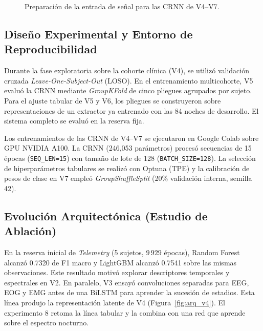 \documentclass[conference]{IEEEtran}
\begin{document}
\begin{figure}[htbp]
\centering
{}
\caption{Preparación de la entrada de señal para las CRNN de V4--V7.}
\label{fig:pipeline_stateless}
\end{figure}

\subsection{Diseño Experimental y Entorno de Reproducibilidad}
Durante la fase exploratoria sobre la cohorte clínica (V4), se utilizó validación cruzada \textit{Leave-One-Subject-Out} (LOSO). En el entrenamiento multicohorte, V5 evaluó la CRNN mediante \textit{GroupKFold} de cinco pliegues agrupados por sujeto. Para el ajuste tabular de V5 y V6, los pliegues se construyeron sobre representaciones de un extractor ya entrenado con las 84 noches de desarrollo. El sistema completo se evaluó en la reserva fija.

Los entrenamientos de las CRNN de V4--V7 se ejecutaron en Google Colab sobre GPU NVIDIA A100. La CRNN (246,053 parámetros) procesó secuencias de 15 épocas (\texttt{SEQ\_LEN=15}) con tamaño de lote de 128 (\texttt{BATCH\_SIZE=128}). La selección de hiperparámetros tabulares se realizó con Optuna (TPE) \cite{akiba2019optuna} y la calibración de pesos de clase en V7 empleó \textit{GroupShuffleSplit} (20\% validación interna, semilla 42).

\subsection{Evolución Arquitectónica (Estudio de Ablación)}
En la reserva inicial de \textit{Telemetry} (5 sujetos, $9\,929$ épocas), Random Forest alcanzó 0.7320 de F1 macro y LightGBM alcanzó 0.7541 sobre las mismas observaciones. Este resultado motivó explorar descriptores temporales y espectrales en V2. En paralelo, V3 ensayó convoluciones separadas para EEG, EOG y EMG antes de una BiLSTM para aprender la sucesión de estadios. Esta línea produjo la representación latente de V4 (Figura~\ref{fig:arq_v4}). El experimento 8 retoma la línea tabular y la combina con una red que aprende sobre el espectro nocturno.
\end{document}
